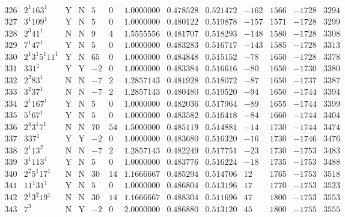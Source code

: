 \documentclass[11pt,reqno,a4letter]{article}
\numberwithin{equation}{section}
\numberwithin{figure}{section}
\numberwithin{table}{section}
\theoremstyle{plain}
\numberwithin{theorem}{section}
\theoremstyle{definition}
\begin{document}
\begin{table}[ht]
\begin{equation*}
{\begin{array}{cc|cc|ccc|cc|cccc}
 326 & 2^1 163^1 & \text{Y} & \text{N} & 5 & 0 & 1.0000000 & 0.478528 & 0.521472 & -162 & 1566 & -1728 & 3294 \\
 327 & 3^1 109^1 & \text{Y} & \text{N} & 5 & 0 & 1.0000000 & 0.480122 & 0.519878 & -157 & 1571 & -1728 & 3299 \\
 328 & 2^3 41^1 & \text{N} & \text{N} & 9 & 4 & 1.5555556 & 0.481707 & 0.518293 & -148 & 1580 & -1728 & 3308 \\
 329 & 7^1 47^1 & \text{Y} & \text{N} & 5 & 0 & 1.0000000 & 0.483283 & 0.516717 & -143 & 1585 & -1728 & 3313 \\
 330 & 2^1 3^1 5^1 11^1 & \text{Y} & \text{N} & 65 & 0 & 1.0000000 & 0.484848 & 0.515152 & -78 & 1650 & -1728 & 3378 \\
 331 & 331^1 & \text{Y} & \text{Y} & -2 & 0 & 1.0000000 & 0.483384 & 0.516616 & -80 & 1650 & -1730 & 3380 \\
 332 & 2^2 83^1 & \text{N} & \text{N} & -7 & 2 & 1.2857143 & 0.481928 & 0.518072 & -87 & 1650 & -1737 & 3387 \\
 333 & 3^2 37^1 & \text{N} & \text{N} & -7 & 2 & 1.2857143 & 0.480480 & 0.519520 & -94 & 1650 & -1744 & 3394 \\
 334 & 2^1 167^1 & \text{Y} & \text{N} & 5 & 0 & 1.0000000 & 0.482036 & 0.517964 & -89 & 1655 & -1744 & 3399 \\
 335 & 5^1 67^1 & \text{Y} & \text{N} & 5 & 0 & 1.0000000 & 0.483582 & 0.516418 & -84 & 1660 & -1744 & 3404 \\
 336 & 2^4 3^1 7^1 & \text{N} & \text{N} & 70 & 54 & 1.5000000 & 0.485119 & 0.514881 & -14 & 1730 & -1744 & 3474 \\
 337 & 337^1 & \text{Y} & \text{Y} & -2 & 0 & 1.0000000 & 0.483680 & 0.516320 & -16 & 1730 & -1746 & 3476 \\
 338 & 2^1 13^2 & \text{N} & \text{N} & -7 & 2 & 1.2857143 & 0.482249 & 0.517751 & -23 & 1730 & -1753 & 3483 \\
 339 & 3^1 113^1 & \text{Y} & \text{N} & 5 & 0 & 1.0000000 & 0.483776 & 0.516224 & -18 & 1735 & -1753 & 3488 \\
 340 & 2^2 5^1 17^1 & \text{N} & \text{N} & 30 & 14 & 1.1666667 & 0.485294 & 0.514706 & 12 & 1765 & -1753 & 3518 \\
 341 & 11^1 31^1 & \text{Y} & \text{N} & 5 & 0 & 1.0000000 & 0.486804 & 0.513196 & 17 & 1770 & -1753 & 3523 \\
 342 & 2^1 3^2 19^1 & \text{N} & \text{N} & 30 & 14 & 1.1666667 & 0.488304 & 0.511696 & 47 & 1800 & -1753 & 3553 \\
 343 & 7^3 & \text{N} & \text{Y} & -2 & 0 & 2.0000000 & 0.486880 & 0.513120 & 45 & 1800 & -1755 & 3555 \\

\end{array}}
\end{equation*}
\end{table}
\end{document}
